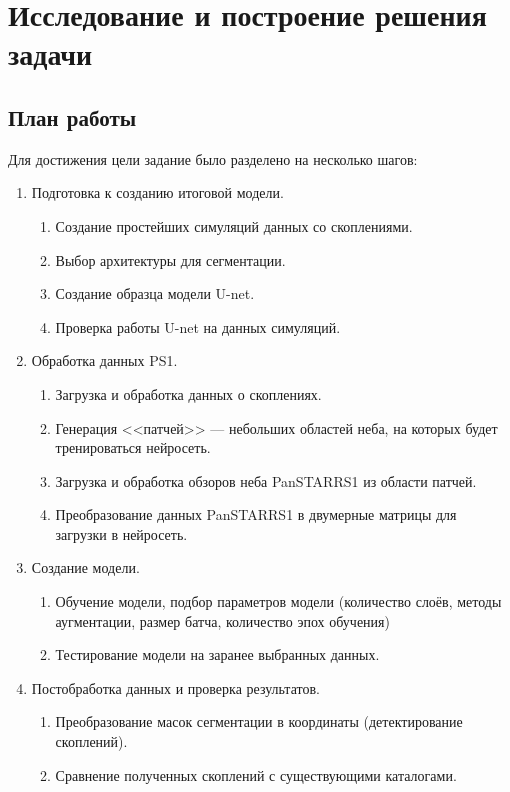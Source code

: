 \chapter{Исследование и построение решения задачи}
\label{cha:ch_3}

\section{План работы}
Для достижения цели задание было разделено на несколько шагов:

\begin{enumerate}

    \item Подготовка к созданию итоговой модели.
    \begin{enumerate}
        \item Создание простейших симуляций данных со скоплениями.
        \item Выбор архитектуры для сегментации.
        \item Создание образца модели U-net.
        \item Проверка работы U-net на данных симуляций.
    \end{enumerate}

    \item Обработка данных PS1.
    \begin{enumerate}
        \item Загрузка и обработка данных о скоплениях.
        \item Генерация <<патчей>> --- небольших областей неба, на которых будет тренироваться нейросеть.
        \item Загрузка и обработка обзоров неба PanSTARRS1 из области патчей.
        \item Преобразование данных PanSTARRS1 в двумерные матрицы для загрузки в нейросеть.
    \end{enumerate}

    \item Создание модели.
    \begin{enumerate}
        \item Обучение модели, подбор параметров модели (количество слоёв, методы аугментации, размер 
            батча, количество эпох обучения)
        \item Тестирование модели на заранее выбранных данных.
    \end{enumerate}

    \item Постобработка данных и проверка результатов.
    \begin{enumerate}
        \item Преобразование масок сегментации в координаты (детектирование скоплений).
        \item Сравнение полученных скоплений с существующими каталогами.
    \end{enumerate}
\end{enumerate}

